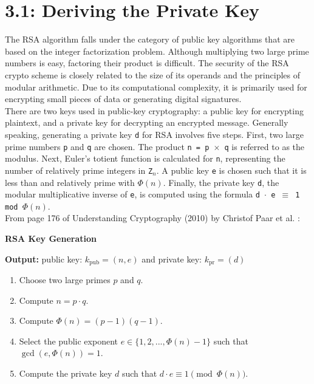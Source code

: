 \documentclass[a4paper,11pt]{article}
\author{Uroosa Imtiaz}
\theoremstyle{mytheor}
\begin{document}
\thispagestyle{plain}
\vspace{-4mm}
\section*{\large 3.1: Deriving the Private Key}

\noindent The RSA algorithm falls under the category of public key algorithms that are based on the integer factorization problem. Although multiplying two large prime numbers is easy, factoring their product is difficult. The security of the RSA crypto scheme is closely related to the size of its operands and the principles of modular arithmetic. Due to its computational complexity, it is primarily used for encrypting small pieces of data or generating digital signatures.\\

\noindent There are two keys used in public-key cryptography: a public key for encrypting plaintext, and a private key for decrypting an encrypted message. Generally speaking, generating a private key \texttt{d} for RSA involves five steps. First, two large prime numbers \texttt{p} and \texttt{q} are chosen. The product \texttt{n = p \(\times\) q} is referred to as the modulus. Next, Euler's totient function is calculated for \texttt{n}, representing the number of relatively prime integers in \texttt{Z\(_n\)}. A public key \texttt{e} is chosen such that it is less than and relatively prime with \(\Phi(n)\). Finally, the private key \texttt{d}, the modular multiplicative inverse of \texttt{e}, is computed using the formula \texttt{d \(\cdot\) e \(\equiv\) 1 mod \(\Phi(n)\)}. \\

\noindent From page 176 of Understanding Cryptography (2010) by Christof Paar et al. :

\begin{tcolorbox}[colback=white,colframe=black,sharp corners, boxrule=0.5pt]
\textbf{RSA Key Generation}

\textbf{Output:} public key: $k_{\text{pub}} = (n,e)$ and private key: $k_{\text{pr}} = (d)$
\begin{enumerate}
    \item Choose two large primes $p$ and $q$.
    \item Compute $n = p \cdot q$.
    \item Compute $\Phi(n)=(p-1)(q-1)$.
    \item Select the public exponent $e \in \{1,2,...,\Phi(n)-1\}$ such that $\gcd(e,\Phi(n)) = 1$.
    \item Compute the private key $d$ such that $d \cdot e \equiv 1 \pmod{\Phi(n)}$.
\end{enumerate}
\end{tcolorbox}
\end{document}
